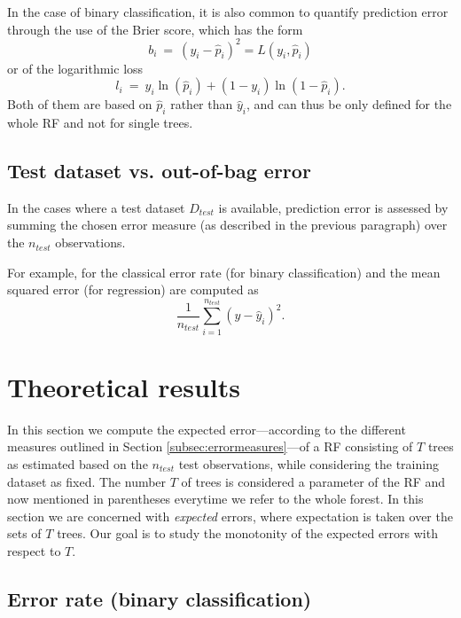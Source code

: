 \documentclass[paper=a4
               ,12pt
               ,DIV=12
               ,parskip=half
               ,titlepage=on
               ,headinclude 
               ,footinclude
               ,headsepline
               ,footsepline         %
               ,ilines 
               ]{scrartcl}
\begin{document}
In the case of binary classification, it is also common to quantify prediction error through the use of the Brier score, which has the form
\[
b_i\ =\ (y_i-\hat{p}_i)^2=L(y_i,\hat{p}_i)
\]
or of the logarithmic loss
\[
l_i\ =\ y_i\ln(\hat{p}_i)+(1-y_i)\ln (1-\hat{p}_i).
\]
Both of them are based on $\hat{p}_i$ rather than $\hat{y}_i$, and can thus be only defined for the whole RF and not for single trees.

\subsection{Test dataset vs. out-of-bag error}
In the cases where a test dataset $D_{test}$ is available, prediction error is assessed by summing the chosen error measure (as described in the previous paragraph) over the $n_{test}$ observations.

For example, for the classical error rate (for binary classification) and the mean squared error (for regression) are computed as
\[
\frac{1}{n_{test}}\sum_{i=1}^{n_{test}}(y-\hat{y}_i)^2.
\]

\section{Theoretical results}
\label{sec:theory}
In this section we compute the expected error---according to the different measures outlined in Section \ref{subsec:errormeasures}---of a RF consisting of $T$ trees as estimated based on the $n_{test}$ test observations, while considering the training dataset as fixed. The number $T$ of trees is considered a parameter of the RF and now mentioned in parentheses everytime we refer to the whole forest. In this section we are concerned with \textit{expected} errors, where expectation is taken over the sets of $T$ trees. Our goal is to study the monotonity of the expected errors with respect to $T$.


\subsection{Error rate (binary classification)}
\end{document}
